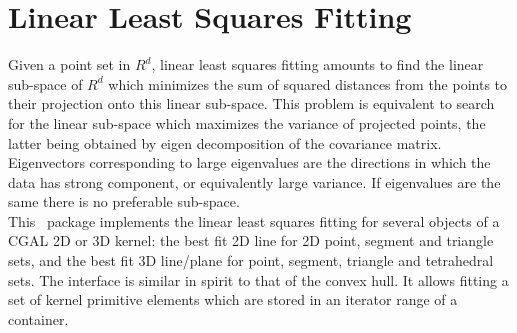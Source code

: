 
\chapter{Linear Least Squares Fitting}
\label{chap:pca}


Given a point set in $R^d$, linear least squares fitting amounts to
find the linear sub-space of $R^d$ which minimizes the sum of squared
distances from the points to their projection onto this linear
sub-space. This problem is equivalent to search for the linear
sub-space which maximizes the variance of projected points, the latter
being obtained by eigen decomposition of the covariance
matrix. Eigenvectors corresponding to large eigenvalues are the
directions in which the data has strong component, or equivalently
large variance. If eigenvalues are the same there is no preferable
sub-space.\\

This \cgal\ package implements the linear least squares fitting 
for several objects of a CGAL 2D or 3D
kernel: the best fit 2D line for 2D point, segment and triangle sets,
and the best fit 3D line/plane for point, segment, triangle and
tetrahedral sets. The interface is similar in spirit to that of the
convex hull. It allows fitting a set of kernel primitive elements
which are stored in an iterator range of a container.

\\

\\
\\
\\
\clearpage

